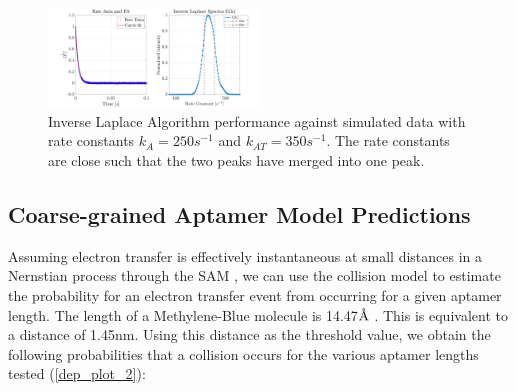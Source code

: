 \begin{figure}[H]
    \centering
    \includegraphics[width = 0.5\textwidth]{img/Inv_laplace_250_350.png}
    \caption{Inverse Laplace Algorithm performance against simulated data with rate constants $k_{A} = 250s^{-1}$ and $k_{AT} = 350s^{-1}$. The rate constants are close such that the two peaks have merged into one peak.}
    \label{multiexp_4}
\end{figure}
\newpage
\subsection{Coarse-grained Aptamer Model Predictions}
Assuming electron transfer is effectively instantaneous at small distances in a Nernstian process through the SAM \cite{finklea1992electron,smalley1995kinetics}, we can use the collision model \cite{huang2013random} to estimate the probability for an electron transfer event from occurring for a given aptamer length. The length of a Methylene-Blue molecule is 14.47$\textup{\AA}$ \cite{dotto2015adsorption}. This is equivalent to a distance of 1.45nm. Using this distance as the threshold value, we obtain the following probabilities that a collision occurs for the various aptamer lengths tested (\autoref{dep_plot_2}):

